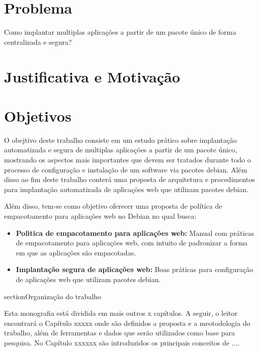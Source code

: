\section{Problema}
%

Como implantar multiplas aplicações a partir de um pacote único de
forma centralizada e segura?

\section{Justificativa e Motivação}


\section{Objetivos}

%

O obejtivo deste trabalho consiste em um estudo prático sobre implantação automatizada
e segura de multiplas aplicações a partir de um pacote único, mostrando os aspectos
mais importantes que devem ser tratados durante todo o processo de configuração
e instalação de um software via pacotes debian. Além disso ao fim deste trabalho
conterá uma proposta de arquitetura e procedimentos para implantação automatizada
de aplicações web que utilizam pacotes debian.

%

Além disso, tem-se como objetivo oferecer uma proposta de política de
empacotamento para aplicações web no Debian no qual busca:

\begin{itemize}
  \item  \textbf{Politica de empacotamento para aplicações web:} Manual com
  práticas de empacotamento para aplicações web, com intuito de padronizar a
  forma em que as aplicações são empacotadas.
  \item  \textbf{Implantação segura de aplicações web:} Boas práticas para
  configuração de aplicações web que utilizam pacotes debian.
\end{itemize}

section{Organização do trabalho}

%

Esta monografia está dividida em mais outros x capítulos. A seguir, o leitor
encontrará o Capítulo xxxxx onde são definidos a proposta e
a meotodologia do trabalho, além de ferramentas e dados que serão utilizados
como base para pesquisa. No Capítulo xxxxxx
são introduzidos os principais conceitos de  ....

